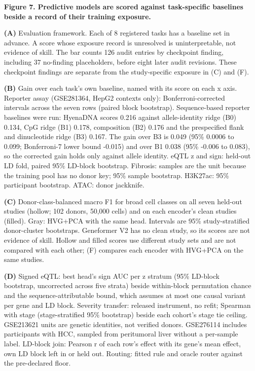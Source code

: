 \textbf{Figure 7. Predictive models are scored against task-specific baselines beside a record of their training exposure.}

\textbf{(A)} Evaluation framework. Each of 8 registered tasks has a baseline set in advance. A score whose exposure record is unresolved is uninterpretable, not evidence of skill. The bar counts 126 audit entries by checkpoint finding, including 37 no-finding placeholders, before eight later audit revisions. These checkpoint findings are separate from the study-specific exposure in (C) and (F).

\textbf{(B)} Gain over each task's own baseline, named with its score on each x axis. Reporter assay (GSE281364, HepG2 contexts only): Bonferroni-corrected intervals across the seven rows (paired block bootstrap). Sequence-based reporter baselines were run: HyenaDNA scores 0.216 against allele-identity ridge (B0) 0.134, CpG ridge (B1) 0.178, composition (B2) 0.176 and the prespecified flank and dinucleotide ridge (B3) 0.167. The gain over B3 is 0.049 (95\% 0.0006 to 0.099; Bonferroni-7 lower bound -0.015) and over B1 0.038 (95\% -0.006 to 0.083), so the corrected gain holds only against allele identity. eQTL \textbar z\textbar{} and sign: held-out LD fold, paired 95\% LD-block bootstrap. Fibrosis: samples are the unit because the training pool has no donor key; 95\% sample bootstrap. H3K27ac: 95\% participant bootstrap. ATAC: donor jackknife.

\textbf{(C)} Donor-class-balanced macro F1 for broad cell classes on all seven held-out studies (hollow; 102 donors, 50,000 cells) and on each encoder's clean studies (filled). Gray: HVG+PCA with the same head. Intervals are 95\% study-stratified donor-cluster bootstraps. Geneformer V2 has no clean study, so its scores are not evidence of skill. Hollow and filled scores use different study sets and are not compared with each other; (F) compares each encoder with HVG+PCA on the same studies.

\textbf{(D)} Signed eQTL: best head's sign AUC per \textbar z\textbar{} stratum (95\% LD-block bootstrap, uncorrected across five strata) beside within-block permutation chance and the sequence-attributable bound, which assumes at most one causal variant per gene and LD block. Severity transfer: released instrument, no refit; Spearman with stage (stage-stratified 95\% bootstrap) beside each cohort's stage tie ceiling. GSE213621 units are genetic identities, not verified donors. GSE276114 includes participants with HCC, sampled from peritumoral liver without a per-sample label. LD-block join: Pearson r of each row's effect with its gene's mean effect, own LD block left in or held out. Routing: fitted rule and oracle router against the pre-declared floor.

